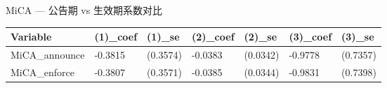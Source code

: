 \caption{MiCA — 公告期 vs 生效期系数对比}
\begin{tabular}{lllllll}
\toprule
Variable & (1)_coef & (1)_se & (2)_coef & (2)_se & (3)_coef & (3)_se \\
\midrule
MiCA_announce & -0.3815 & (0.3574) & -0.0383 & (0.0342) & -0.9778 & (0.7357) \\
MiCA_enforce & -0.3807 & (0.3571) & -0.0385 & (0.0344) & -0.9831 & (0.7398) \\
\bottomrule
\end{tabular}
